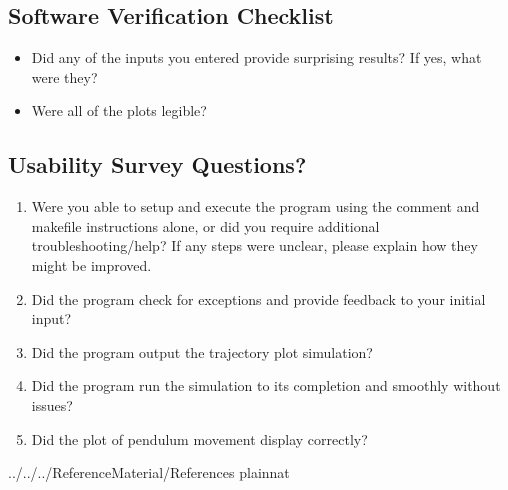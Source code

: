 \documentclass[12pt, titlepage]{article}
\begin{document}
\subsection{Software Verification Checklist} 
\label{softwarevercheck}
\begin{itemize}
	\item Did any of the inputs you entered provide surprising results? 
	If yes, what were they?
	\item Were all of the plots legible? 
\end{itemize} 

\subsection{Usability Survey Questions?}
\begin{enumerate}
	\item Were you able to setup and execute the program using the comment
	and makefile instructions alone, or did you require additional troubleshooting/help? 
	If any steps were unclear, please explain how they might be improved.
	\item Did the program check for exceptions and provide feedback to your initial input?
	\item Did the program output the trajectory plot simulation?
	\item Did the program run the simulation to its completion and smoothly without issues?
	\item Did the plot of pendulum movement display correctly?
\end{enumerate}

\newpage

 {../../../ReferenceMaterial/References}
 {plainnat}
\end{document}
